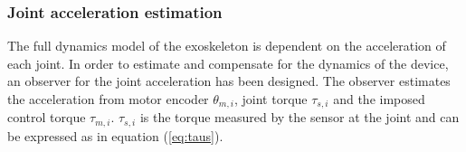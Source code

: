 




%





\subsubsection{Joint acceleration estimation}  \label{acc_observer}

The full dynamics model of the exoskeleton  is dependent on the acceleration of each joint. In order to estimate and compensate for the dynamics of the device, an observer for the joint acceleration has been designed. 
The observer estimates the acceleration from motor encoder $\theta_{m,i}$,  joint torque $\tau_{s,i}$ and the imposed control torque $\tau_{m,i}$.
$\tau_{s,i}$ is the torque measured by the sensor at the joint and can be expressed as in equation (\ref{eq:taus}).

